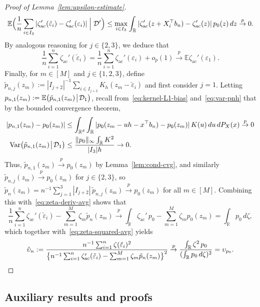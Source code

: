\documentclass[a4paper]{article}
\newcommand{\R}{\mathbb{R}}
\newcommand{\E}{\mathbb{E}}
\newcommand{\norm}[1]{\|{#1}\|}
\newcommand{\cvp}{\overset{p}{\to}}
\DeclareMathOperator\Var{Var}
\theoremstyle{definition}
\begin{document}
\begin{proof}[Proof of Lemma~\ref{lem:upsilon-estimate}]
\[
\E\Bigl(\frac{1}{n}\sum_{i \in I_3} |\zeta_{\mathrm{ac}}'(\check{\varepsilon}_i) - \zeta_{\mathrm{ac}}'(\varepsilon_i)| \Bigm| \mathcal{D}'\Bigr) \leq \max_{i \in I_3} \int_\R |\zeta_{\mathrm{ac}}'(z + X_i^\top b_n) - \zeta_{\mathrm{ac}}'(z)|\,p_0(z)\,dz \cvp 0.
\]
By analogous reasoning for $j \in \{2,3\}$, we deduce that
\begin{equation}
\label{eq:zeta-deriv-avg}
\frac{1}{n}\sum_{i=1}^n \zeta_{\mathrm{ac}}'(\check{\varepsilon}_i) = \frac{1}{n}\sum_{i=1}^n \zeta_{\mathrm{ac}}'(\varepsilon_i) + o_p(1) \cvp \E\zeta_{\mathrm{ac}}'(\varepsilon_1).
\end{equation}
Finally, for $m \in [M]$ and $j \in \{1,2,3\}$, define $\tilde{p}_{n,j}(z_m) := |I_{j+2}|^{-1}\sum_{i \in I_{j+2}} K_h(z_m - \check{\varepsilon}_i)$ and first consider $j = 1$. Letting $p_{n,1}(z_m) := \E\bigl(\tilde{p}_{n,1}(z_m) \!\bigm|\! \mathcal{D}_1\bigr)$, recall from~\eqref{eq:kernel-L1-bias} and~\eqref{eq:var-pnh} that by the bounded convergence theorem,
\begin{align*}
|p_{n,1}(z_m) - p_0(z_m)| &\leq \int_{\R^d} \int_\R |p_0(z_m - uh - x^\top b_n) - p_0(z_m)|\,K(u)\,du\,dP_X(x) \cvp 0 \\
\Var\bigl(\tilde{p}_{n,1}(z_m) \!\bigm|\! \mathcal{D}_1\bigr) &\leq \frac{\norm{p_0}_\infty \int_\R K^2}{|I_3| h} \to 0.
\end{align*}
Thus, $\tilde{p}_{n,1}(z_m) \cvp p_0(z_m)$ by Lemma~\ref{lem:cond-cvg}, and similarly $\tilde{p}_{n,j}(z_m) \cvp p_0(z_m)$ for $j \in \{2,3\}$, so $\tilde{p}_n(z_m) = n^{-1}\sum_{j=1}^3 |I_{j+2}|\,\tilde{p}_{n,j}(z_m) \cvp p_0(z_m)$ for all $m \in [M]$. Combining this with~\eqref{eq:zeta-deriv-avg} shows that
\[
\frac{1}{n}\sum_{i=1}^n \zeta_{\mathrm{ac}}'(\check{\varepsilon}_i) - \sum_{m=1}^M \zeta_m\tilde{p}_n(z_m) \cvp \int_\R \zeta_{\mathrm{ac}}'\,p_0 - \sum_{m=1}^M \zeta_m p_0(z_m) = \int_\R p_0\,d\zeta,
\]
which together with~\eqref{eq:zeta-squared-avg} yields
\[
\hat{\upsilon}_n := \frac{n^{-1}\sum_{i=1}^n \zeta(\check{\varepsilon}_i)^2}{\bigl\{n^{-1}\sum_{i=1}^n \zeta_{\mathrm{ac}}'(\check{\varepsilon}_i) - \sum_{m=1}^M \zeta_m\tilde{p}_n(z_m)\bigr\}^2} \cvp \frac{\int_\R \zeta^2\,p_0}{(\int_\R p_0\,d\zeta)^2} = \upsilon_{p_0}. \qedhere
\]
\end{proof}

\subsection{Auxiliary results and proofs}
\label{sec:auxiliary}
\end{document}
